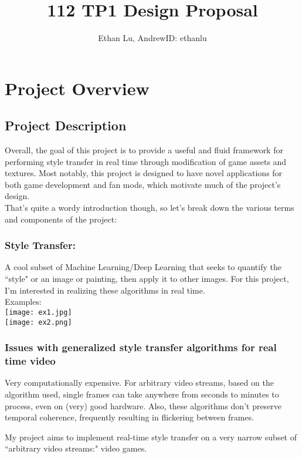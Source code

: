 \documentclass[12pt]{article}
\begin{document}
\title{112 TP1 Design Proposal}
\author{Ethan Lu, AndrewID: ethanlu}
\maketitle
\section{Project Overview}

\subsection{Project Description}
    Overall, the goal of this project is to provide a useful and fluid framework for performing style transfer in real time through modification of game assets and textures. 
    Most notably, this project is designed to have novel applications for both game development and fan mods, which motivate much of the project's design. \\
    That's quite a wordy introduction though, so let's break down the various terms and components of the project:

    \subsubsection{Style Transfer:}
    A cool subset of Machine Learning/Deep Learning that seeks to quantify the ``style" or an image or painting, then apply it to other images. 
    For this project, I'm interested in realizing these algorithms in real time.\\
    Examples: \\
    \texttt{[image: ex1.jpg]}\\
    \texttt{[image: ex2.png]}

    \subsubsection{Issues with generalized style transfer algorithms for real time video}
    
    Very computationally expensive. For arbitrary video streams, based on the algorithm used, single frames can take anywhere from seconds to minutes to process, even on (very) good hardware.
    Also, these algorithms don't preserve temporal coherence, frequently resulting in flickering between frames. 

    My project aims to implement real-time style transfer on a very narrow subset of ``arbitrary video streams:" video games.
\end{document}
